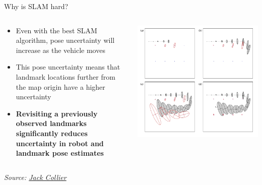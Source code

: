 \documentclass[compress]{beamer}
\newcommand{\source}[2]{{\tiny\it Source: \href{#1}{#2}}}
\begin{document}
\begin{frame}{Why is SLAM hard?}
{\begin{columns}
\begin{column}{0.5\linewidth}
                    \begin{itemize}
                        \item Even with the best SLAM algorithm, pose
                            uncertainty will increase as the vehicle moves
                        \item This pose uncertainty means that landmark
                            locations further from the map origin have a higher
                            uncertainty
                        \item \textbf{Revisiting a previously observed landmarks
                            significantly reduces uncertainty in robot and
                            landmark pose estimates}
                    \end{itemize}

            \end{column}
            \begin{column}{0.5\linewidth}
                \begin{center}
                    \includegraphics[width=\linewidth]{loopclosure}
                \end{center}
            \end{column}
        \end{columns}
    }

\source{http://www.computerrobotvision.org/2010/slam_camp/collier_intro.pdf}{Jack Collier}
\end{frame}
\end{document}

